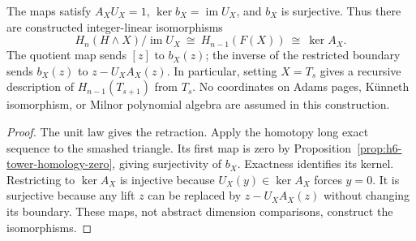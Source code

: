 \begin{proposition}
  \label{prop:h6-homology-normalization}
  \leanok
  The maps satisfy $A_XU_X=1$, $\ker b_X=\operatorname{im}U_X$, and
  $b_X$ is surjective. Thus there are constructed integer-linear isomorphisms
  \[
    H_n(H\wedge X)/\operatorname{im}U_X
      \ \cong\ H_{n-1}(F(X))
      \ \cong\ \ker A_X.
  \]
  The quotient map sends $[z]$ to $b_X(z)$; the inverse of the restricted
  boundary sends $b_X(z)$ to $z-U_XA_X(z)$. In particular, setting $X=T_s$
  gives a recursive description of $H_{n-1}(T_{s+1})$ from $T_s$.
  No coordinates on Adams pages, K\"unneth isomorphism, or Milnor polynomial
  algebra are assumed in this construction.
\end{proposition}
\begin{proof}
  The unit law gives the retraction. Apply the homotopy long exact sequence
  to the smashed triangle. Its first map is zero by
  Proposition~\ref{prop:h6-tower-homology-zero}, giving surjectivity of $b_X$.
  Exactness identifies its kernel. Restricting to $\ker A_X$ is injective
  because $U_X(y)\in\ker A_X$ forces $y=0$. It is surjective because any
  lift $z$ can be replaced by $z-U_XA_X(z)$ without changing its boundary.
  These maps, not abstract dimension comparisons, construct the isomorphisms.
  \leanok
\end{proof}

